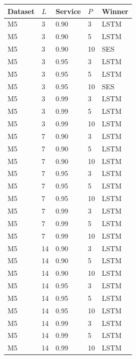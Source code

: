 {\scriptsize
\setlength\tabcolsep{4pt}
\begin{tabular}{lllll}
\toprule Dataset & $L$ & Service & $P$ & Winner \\
\midrule
M5 & 3 & 0.90 & 3 & LSTM \\
M5 & 3 & 0.90 & 5 & LSTM \\
M5 & 3 & 0.90 & 10 & SES \\
M5 & 3 & 0.95 & 3 & LSTM \\
M5 & 3 & 0.95 & 5 & LSTM \\
M5 & 3 & 0.95 & 10 & SES \\
M5 & 3 & 0.99 & 3 & LSTM \\
M5 & 3 & 0.99 & 5 & LSTM \\
M5 & 3 & 0.99 & 10 & LSTM \\
M5 & 7 & 0.90 & 3 & LSTM \\
M5 & 7 & 0.90 & 5 & LSTM \\
M5 & 7 & 0.90 & 10 & LSTM \\
M5 & 7 & 0.95 & 3 & LSTM \\
M5 & 7 & 0.95 & 5 & LSTM \\
M5 & 7 & 0.95 & 10 & LSTM \\
M5 & 7 & 0.99 & 3 & LSTM \\
M5 & 7 & 0.99 & 5 & LSTM \\
M5 & 7 & 0.99 & 10 & LSTM \\
M5 & 14 & 0.90 & 3 & LSTM \\
M5 & 14 & 0.90 & 5 & LSTM \\
M5 & 14 & 0.90 & 10 & LSTM \\
M5 & 14 & 0.95 & 3 & LSTM \\
M5 & 14 & 0.95 & 5 & LSTM \\
M5 & 14 & 0.95 & 10 & LSTM \\
M5 & 14 & 0.99 & 3 & LSTM \\
M5 & 14 & 0.99 & 5 & LSTM \\
M5 & 14 & 0.99 & 10 & LSTM \\
\bottomrule
\end{tabular}}
